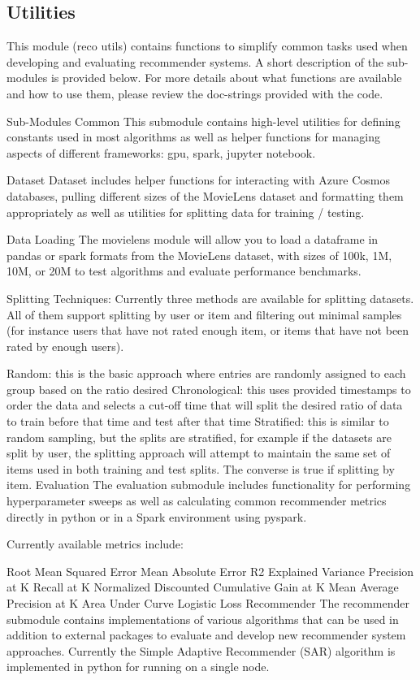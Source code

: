 \subsection{Utilities}

This module (reco utils) contains functions to simplify common tasks used when developing and evaluating recommender systems. A short description of the sub-modules is provided below. For more details about what functions are available and how to use them, please review the doc-strings provided with the code.

Sub-Modules
Common
This submodule contains high-level utilities for defining constants used in most algorithms as well as helper functions for managing aspects of different frameworks: gpu, spark, jupyter notebook.

Dataset
Dataset includes helper functions for interacting with Azure Cosmos databases, pulling different sizes of the MovieLens dataset and formatting them appropriately as well as utilities for splitting data for training / testing.

Data Loading
The movielens module will allow you to load a dataframe in pandas or spark formats from the MovieLens dataset, with sizes of 100k, 1M, 10M, or 20M to test algorithms and evaluate performance benchmarks.

Splitting Techniques:
Currently three methods are available for splitting datasets. All of them support splitting by user or item and filtering out minimal samples (for instance users that have not rated enough item, or items that have not been rated by enough users).

Random: this is the basic approach where entries are randomly assigned to each group based on the ratio desired
Chronological: this uses provided timestamps to order the data and selects a cut-off time that will split the desired ratio of data to train before that time and test after that time
Stratified: this is similar to random sampling, but the splits are stratified, for example if the datasets are split by user, the splitting approach will attempt to maintain the same set of items used in both training and test splits. The converse is true if splitting by item.
Evaluation
The evaluation submodule includes functionality for performing hyperparameter sweeps as well as calculating common recommender metrics directly in python or in a Spark environment using pyspark.

Currently available metrics include:

Root Mean Squared Error
Mean Absolute Error
R2
Explained Variance
Precision at K
Recall at K
Normalized Discounted Cumulative Gain at K
Mean Average Precision at K
Area Under Curve
Logistic Loss
Recommender
The recommender submodule contains implementations of various algorithms that can be used in addition to external packages to evaluate and develop new recommender system approaches. Currently the Simple Adaptive Recommender (SAR) algorithm is implemented in python for running on a single node.
